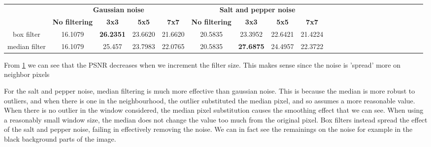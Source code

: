 \documentclass{article}
\begin{document}
\begin{table}
	\centering
	\captionsetup{justification=centering}
	\renewcommand{\arraystretch}{1.5}
	\setlength{\abovecaptionskip}{15pt plus 3pt minus 2pt} %
	\begin{tabular}{|c|c|c|c|c|c|c|c|c|c|c|c|c|c|c|c|c|c|c|c|c|c|c|}
		\hline
		& \multicolumn{4}{c|}{\textbf{Gaussian noise}} & \multicolumn{4}{c|}{\textbf{Salt and pepper noise}}  \\
		& \textbf{No filtering} &\textbf{3x3} & \textbf{5x5} & \textbf{7x7} & \textbf{No filtering} & \textbf{3x3} & \textbf{5x5} & \textbf{7x7} \\
		\hline
	box filter     & 16.1079 &  \textbf{26.2351} & 23.6620  & 21.6620 & 20.5835 & 23.3952 & 22.6421 & 21.4224  \\ \hline
	median filter  & 16.1079 & 25.457 & 23.7983       & 22.0765 & 20.5835 & \textbf{27.6875} & 24.4957 & 22.3722 \\ \hline

	
	\end{tabular}

	\caption{}
	\label{tab:box-median-res}
\end{table}

From \cref{tab:box-median-res} we can see that the PSNR decreases when we increment the filter size. This makes sense since the noise is 'spread' more on neighbor pixels

For the salt and pepper noise, median filtering is much more effective than gaussian noise. This is because the median is more robust to outliers, and when there is one in the neighbourhood, the outlier substituted the median pixel, and so assumes a more reasonable value. When there is no outlier in the window considered, the median pixel substitution causes the smoothing effect that we can see. When using a reasonably small window size, the median does not change the value too much from the original pixel. 
Box filters instead spread the effect of the salt and pepper noise, failing in effectively removing the noise. We can in fact see the remainings on the noise for example in the black background parts of the image.
\end{document}
